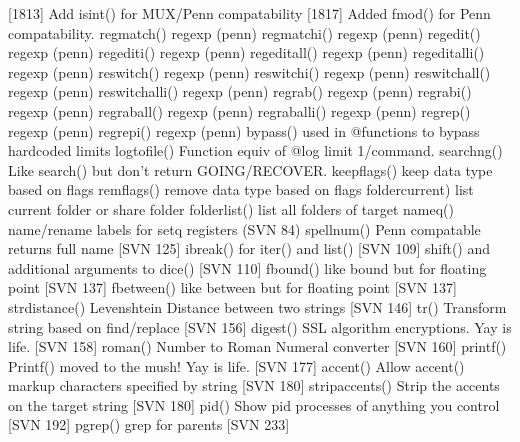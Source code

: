 \documentclass[letterpaper,10pt,english]{sphinxmanual}
\begin{document}
\sphinxAtStartPar
{[}18\sphinxhyphen{}13{]} Add isint() for MUX/Penn compatability
{[}18\sphinxhyphen{}17{]} Added fmod() for Penn compatability.
regmatch()      \sphinxhyphen{} regexp (penn)
regmatchi()     \sphinxhyphen{} regexp (penn)
regedit()       \sphinxhyphen{} regexp (penn)
regediti()      \sphinxhyphen{} regexp (penn)
regeditall()    \sphinxhyphen{} regexp (penn)
regeditalli()   \sphinxhyphen{} regexp (penn)
reswitch()      \sphinxhyphen{} regexp (penn)
reswitchi()     \sphinxhyphen{} regexp (penn)
reswitchall()   \sphinxhyphen{} regexp (penn)
reswitchalli()  \sphinxhyphen{} regexp (penn)
regrab()        \sphinxhyphen{} regexp (penn)
regrabi()       \sphinxhyphen{} regexp (penn)
regraball()     \sphinxhyphen{} regexp (penn)
regraballi()    \sphinxhyphen{} regexp (penn)
regrep()        \sphinxhyphen{} regexp (penn)
regrepi()       \sphinxhyphen{} regexp (penn)
bypass()        \sphinxhyphen{} used in @functions to bypass hardcoded limits
logtofile()     \sphinxhyphen{} Function equiv of @log \sphinxhyphen{} limit 1/command.
searchng()      \sphinxhyphen{} Like search() but don’t return GOING/RECOVER.
keepflags()     \sphinxhyphen{} keep data type based on flags
remflags()      \sphinxhyphen{} remove data type based on flags
foldercurrent)  \sphinxhyphen{} list current folder or share folder
folderlist()    \sphinxhyphen{} list all folders of target
nameq()         \sphinxhyphen{} name/rename labels for setq registers (SVN 84)
spellnum()      \sphinxhyphen{} Penn compatable returns full name {[}SVN 125{]}
ibreak()        \sphinxhyphen{} for iter() and list() {[}SVN 109{]}
shift()         \sphinxhyphen{} and additional arguments to dice() {[}SVN 110{]}
fbound()        \sphinxhyphen{} like bound but for floating point {[}SVN 137{]}
fbetween()      \sphinxhyphen{} like between but for floating point {[}SVN 137{]}
strdistance()   \sphinxhyphen{} Levenshtein Distance between two strings {[}SVN 146{]}
tr()            \sphinxhyphen{} Transform string based on find/replace {[}SVN 156{]}
digest()        \sphinxhyphen{} SSL algorithm encryptions.  Yay is life. {[}SVN 158{]}
roman()         \sphinxhyphen{} Number to Roman Numeral converter {[}SVN 160{]}
printf()        \sphinxhyphen{} Printf() moved to the mush!  Yay is life. {[}SVN 177{]}
accent()        \sphinxhyphen{} Allow accent() markup characters specified by string {[}SVN 180{]}
stripaccents()  \sphinxhyphen{} Strip the accents on the target string {[}SVN 180{]}
pid()           \sphinxhyphen{} Show pid processes of anything you control {[}SVN 192{]}
pgrep()         \sphinxhyphen{} grep for parents {[}SVN 233{]}
\end{document}
